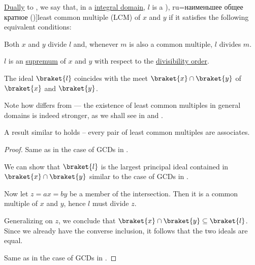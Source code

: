 \begin{definition}\label{def:lcm}
  \hyperref[def:semilattice/duality]{Dually} to , we say that, in a \hyperref[def:integral_domain]{integral domain}, \( l \) is a \term[bg=най-малко общо кратно (\cite[381]{ГеновМиховскиМоллов1991}), ru=наименьшее общее кратное (\cite[exer. 3.6.3]{Винберг2014})]{least common multiple} (LCM) of \( x \) and \( y \) if it satisfies the following equivalent conditions:

  \begin{thmenum}
     Both \( x \) and \( y \) divide \( l \) and, whenever \( m \) is also a common multiple, \( l \) divides \( m \).

     \( l \) is an \hyperref[def:extremal_points/supremum_and_infimum]{supremum} of \( x \) and \( y \) with respect to the \hyperref[thm:semiring_divisibility_order]{divisibility order}.

     The ideal \( \braket{ l } \) coincides with the meet \( \braket{ x } \cap \braket{ y } \) of \( \braket{ x } \) and \( \braket{ y } \).
  \end{thmenum}
\end{definition}
\begin{comments}
  \item Note how  differs from  --- the existence of least common multiples in general domains is indeed stronger, as we shall see in  and .
  \item A result similar to  holds -- every pair of least common multiples are associates.
\end{comments}
\begin{proof}
   Same as in the case of GCDs in .

   We can show that \( \braket{ l } \) is the largest principal ideal contained in \( \braket{ x } \cap \braket{ y } \) similar to the case of GCDs in .

  Now let \( z = ax = by \) be a member of the intersection. Then it is a common multiple of \( x \) and \( y \), hence \( l \) must divide \( z \).

  Generalizing on \( z \), we conclude that \( \braket{ x } \cap \braket{ y } \subseteq \braket{ l } \). Since we already have the converse inclusion, it follows that the two ideals are equal.

   Same as in the case of GCDs in .
\end{proof}

